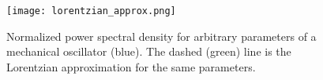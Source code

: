 \begin{figure}[H]
\centering
\texttt{[image: lorentzian\_approx.png]}
\caption{Normalized power spectral density for arbitrary parameters of a mechanical oscillator (blue). The dashed (green) line is the Lorentzian approximation for the same parameters.}
\label{fig:lor_approx}
\end{figure}